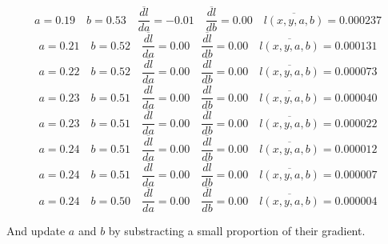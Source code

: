 \documentclass[9pt]{beamer}
\begin{document}
\begin{frame}
\begin{overprint}
     \[ a = 0.19 \quad b = 0.53 \quad \overline{\frac{dl}{da}} = -0.01 \quad \overline{\frac{dl}{db}} = 0.00 \quad \overline{l(x, y, a, b)} = 0.000237 \]
     \[ a = 0.21 \quad b = 0.52 \quad \overline{\frac{dl}{da}} = 0.00 \quad \overline{\frac{dl}{db}} = 0.00 \quad \overline{l(x, y, a, b)} = 0.000131 \]
     \[ a = 0.22 \quad b = 0.52 \quad \overline{\frac{dl}{da}} = 0.00 \quad \overline{\frac{dl}{db}} = 0.00 \quad \overline{l(x, y, a, b)} = 0.000073 \]
     \[ a = 0.23 \quad b = 0.51 \quad \overline{\frac{dl}{da}} = 0.00 \quad \overline{\frac{dl}{db}} = 0.00 \quad \overline{l(x, y, a, b)} = 0.000040 \]
     \[ a = 0.23 \quad b = 0.51 \quad \overline{\frac{dl}{da}} = 0.00 \quad \overline{\frac{dl}{db}} = 0.00 \quad \overline{l(x, y, a, b)} = 0.000022 \]
     \[ a = 0.24 \quad b = 0.51 \quad \overline{\frac{dl}{da}} = 0.00 \quad \overline{\frac{dl}{db}} = 0.00 \quad \overline{l(x, y, a, b)} = 0.000012 \]
     \[ a = 0.24 \quad b = 0.51 \quad \overline{\frac{dl}{da}} = 0.00 \quad \overline{\frac{dl}{db}} = 0.00 \quad \overline{l(x, y, a, b)} = 0.000007 \]
     \[ a = 0.24 \quad b = 0.50 \quad \overline{\frac{dl}{da}} = 0.00 \quad \overline{\frac{dl}{db}} = 0.00 \quad \overline{l(x, y, a, b)} = 0.000004 \]
  \end{overprint}
  
  \bigskip

  And update $a$ and $b$ by substracting a small proportion of their
  gradient.

\end{frame}
\end{document}
